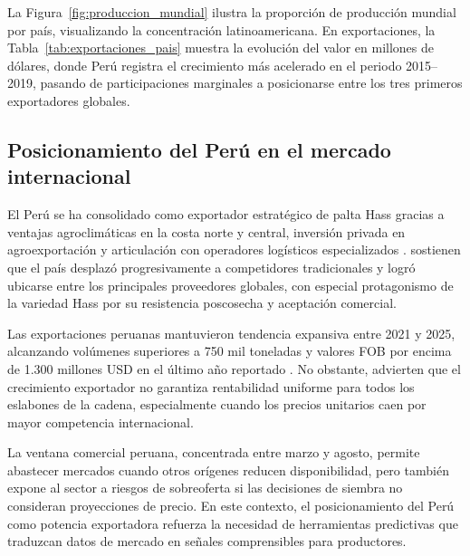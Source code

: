 La Figura~\ref{fig:produccion_mundial} ilustra la proporci\'on de producci\'on mundial por pa\'is, visualizando la concentraci\'on latinoamericana. En exportaciones, la Tabla~\ref{tab:exportaciones_pais} muestra la evoluci\'on del valor en millones de d\'olares, donde Per\'u registra el crecimiento m\'as acelerado en el periodo 2015--2019, pasando de participaciones marginales a posicionarse entre los tres primeros exportadores globales.




\subsection{Posicionamiento del Per\'u en el mercado internacional}

El Per\'u se ha consolidado como exportador estrat\'egico de palta Hass gracias a ventajas agroclim\'aticas en la costa norte y central, inversi\'on privada en agroexportaci\'on y articulaci\'on con operadores log\'isticos especializados \citep{VitteryFlores2023, Pantaleon2024}. \citet{VitteryFlores2023} sostienen que el pa\'is desplaz\'o progresivamente a competidores tradicionales y logr\'o ubicarse entre los principales proveedores globales, con especial protagonismo de la variedad Hass por su resistencia poscosecha y aceptaci\'on comercial.

Las exportaciones peruanas mantuvieron tendencia expansiva entre 2021 y 2025, alcanzando vol\'umenes superiores a 750 mil toneladas y valores FOB por encima de 1.300 millones USD en el \'ultimo a\~no reportado \citep{PromPeru2026, MIDAGRI2024}. No obstante, \citet{Capunay2025} advierten que el crecimiento exportador no garantiza rentabilidad uniforme para todos los eslabones de la cadena, especialmente cuando los precios unitarios caen por mayor competencia internacional.

La ventana comercial peruana, concentrada entre marzo y agosto, permite abastecer mercados cuando otros or\'igenes reducen disponibilidad, pero tambi\'en expone al sector a riesgos de sobreoferta si las decisiones de siembra no consideran proyecciones de precio. En este contexto, el posicionamiento del Per\'u como potencia exportadora refuerza la necesidad de herramientas predictivas que traduzcan datos de mercado en se\~nales comprensibles para productores.
